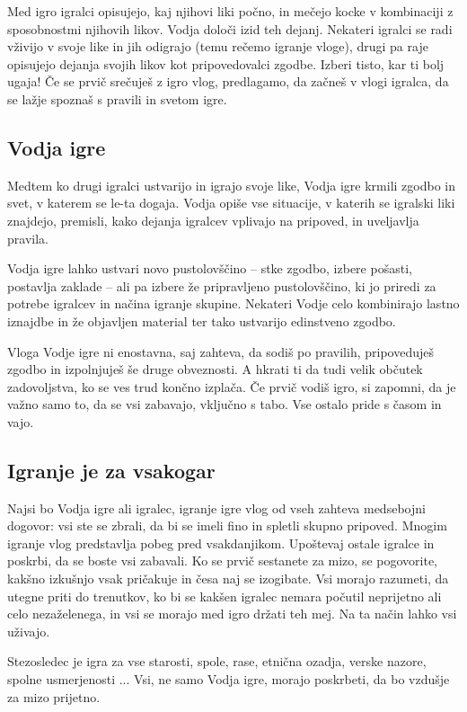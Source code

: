 Med igro igralci opisujejo, kaj njihovi liki počno, in mečejo kocke v kombinaciji z sposobnostmi njihovih likov. Vodja določi izid teh dejanj. Nekateri igralci se radi vživijo v svoje like in jih odigrajo (temu rečemo igranje vloge), drugi pa raje opisujejo dejanja svojih likov kot pripovedovalci zgodbe. Izberi tisto, kar ti bolj ugaja! Če se prvič srečuješ z igro vlog, predlagamo, da začneš v vlogi igralca, da se lažje spoznaš s pravili in svetom igre.

\subsection{Vodja igre}

Medtem ko drugi igralci ustvarijo in igrajo svoje like, Vodja igre krmili zgodbo in svet, v katerem se le-ta dogaja. Vodja opiše vse situacije, v katerih se igralski liki znajdejo, premisli, kako dejanja igralcev vplivajo na pripoved, in uveljavlja pravila.

Vodja igre lahko ustvari novo pustolovščino -- stke zgodbo, izbere pošasti, postavlja zaklade -- ali pa izbere že pripravljeno pustolovščino, ki jo priredi za potrebe igralcev in načina igranje skupine. Nekateri Vodje celo kombinirajo lastno iznajdbe in že objavljen material ter tako ustvarijo edinstveno zgodbo.

Vloga Vodje igre ni enostavna, saj zahteva, da sodiš po pravilih, pripoveduješ zgodbo in izpolnjuješ še druge obveznosti. A hkrati ti da tudi velik občutek zadovoljstva, ko se ves trud končno izplača. Če prvič vodiš igro, si zapomni, da je važno samo to, da se vsi zabavajo, vključno s tabo. Vse ostalo pride s časom in vajo.

\subsection{Igranje je za vsakogar}

Najsi bo Vodja igre ali igralec, igranje igre vlog od vseh zahteva medsebojni dogovor: vsi ste se zbrali, da bi se imeli fino in spletli skupno pripoved. Mnogim igranje vlog predstavlja pobeg pred vsakdanjikom. Upoštevaj ostale igralce in poskrbi, da se boste vsi zabavali. Ko se prvič sestanete za mizo, se pogovorite, kakšno izkušnjo vsak pričakuje in česa naj se izogibate. Vsi morajo razumeti, da utegne priti do trenutkov, ko bi se kakšen igralec nemara počutil neprijetno ali celo nezaželenega, in vsi se morajo med igro držati teh mej. Na ta način lahko vsi uživajo.

Stezosledec je igra za vse starosti, spole, rase, etnična ozadja, verske nazore, spolne usmerjenosti ... Vsi, ne samo Vodja igre, morajo poskrbeti, da bo vzdušje za mizo prijetno.

